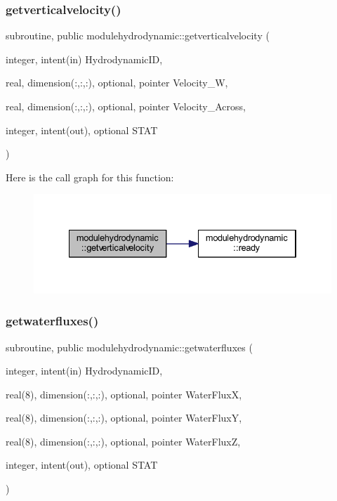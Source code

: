 \subsubsection{\texorpdfstring{getverticalvelocity()}{getverticalvelocity()}}
{\footnotesize\ttfamily subroutine, public modulehydrodynamic\+::getverticalvelocity (\begin{DoxyParamCaption}\item[{integer, intent(in)}]{Hydrodynamic\+ID,  }\item[{real, dimension(\+:,\+:,\+:), optional, pointer}]{Velocity\+\_\+W,  }\item[{real, dimension(\+:,\+:,\+:), optional, pointer}]{Velocity\+\_\+\+Across,  }\item[{integer, intent(out), optional}]{S\+T\+AT }\end{DoxyParamCaption})}

Here is the call graph for this function\+:\nopagebreak
\begin{figure}[H]
\begin{center}
\leavevmode
\includegraphics[width=334pt]{namespacemodulehydrodynamic_a6f64fd12742f48039f81460df9c0cd42_cgraph}
\end{center}
\end{figure}
\mbox{\label{namespacemodulehydrodynamic_a29f89183d9394468a6db08ec640599f1}} 
\subsubsection{\texorpdfstring{getwaterfluxes()}{getwaterfluxes()}}
{\footnotesize\ttfamily subroutine, public modulehydrodynamic\+::getwaterfluxes (\begin{DoxyParamCaption}\item[{integer, intent(in)}]{Hydrodynamic\+ID,  }\item[{real(8), dimension(\+:,\+:,\+:), optional, pointer}]{Water\+FluxX,  }\item[{real(8), dimension(\+:,\+:,\+:), optional, pointer}]{Water\+FluxY,  }\item[{real(8), dimension(\+:,\+:,\+:), optional, pointer}]{Water\+FluxZ,  }\item[{integer, intent(out), optional}]{S\+T\+AT }\end{DoxyParamCaption})}

